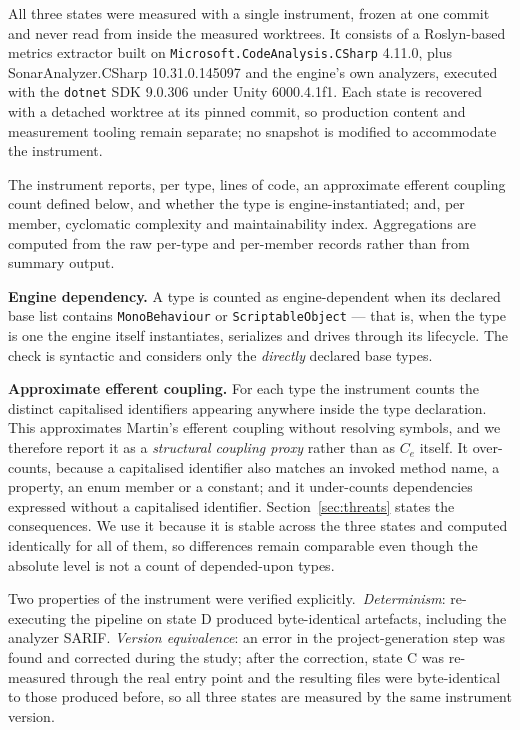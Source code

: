 \documentclass{sbc2019}%
\begin{document}
All three states were measured with a single instrument, frozen at one commit
and never read from inside the measured worktrees. It consists of a Roslyn-based
metrics extractor built on \texttt{Microsoft.CodeAnalysis.CSharp} 4.11.0, plus
SonarAnalyzer.CSharp 10.31.0.145097 and the engine's own analyzers, executed with
the \texttt{dotnet} SDK 9.0.306 under Unity 6000.4.1f1. Each state is recovered with a detached
worktree at its pinned commit, so production content and measurement tooling
remain separate; no snapshot is modified to accommodate the instrument.

The instrument reports, per type, lines of code, an approximate efferent
coupling count defined below, and whether the type is engine-instantiated; and,
per member, cyclomatic complexity and maintainability index. Aggregations are
computed from the raw per-type and per-member records rather than from summary
output.

\medskip\noindent\textbf{Engine dependency.} A type is counted as
engine-dependent when its declared base list contains \texttt{MonoBehaviour} or
\texttt{ScriptableObject} --- that is, when the type is one the engine itself
instantiates, serializes and drives through its lifecycle. The check is
syntactic and considers only the \emph{directly} declared base types.

\medskip\noindent\textbf{Approximate efferent coupling.} For each type the
instrument counts the distinct capitalised identifiers appearing anywhere inside
the type declaration. This approximates Martin's efferent coupling
\cite{martin2003} without resolving symbols, and we therefore report it as a
\emph{structural coupling proxy} rather than as $C_e$ itself. It over-counts,
because a capitalised identifier also matches an invoked method name, a
property, an enum member or a constant; and it under-counts dependencies
expressed without a capitalised identifier. Section~\ref{sec:threats} states the
consequences. We use it because it is stable across the three states and
computed identically for all of them, so differences remain comparable even
though the absolute level is not a count of depended-upon types.

Two properties of the instrument were verified explicitly.\ \emph{Determinism}:
re-executing the pipeline on state D produced byte-identical artefacts,
including the analyzer SARIF\@. \emph{Version equivalence}: an error in the
project-generation step was found and corrected during the study; after the
correction, state C was re-measured through the real entry point and the
resulting files were byte-identical to those produced before, so all three
states are measured by the same instrument version.
\end{document}
